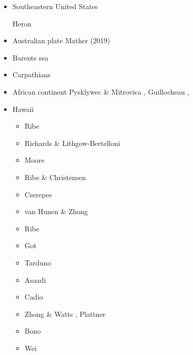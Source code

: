 \begin{itemize}
\item{Southeastern United States}

\begin{scriptsize}
Heron \etal \cite{heps18}
\end{scriptsize}


\item Australian plate 
{\scriptsize
\cite{himu03}\cite{wemv03}\cite{pymi03}\cite{onml03}
\cite{onmj05}
\cite{hazs10}\cite{dimg10}
\cite{mahg11}\cite{digm11}
\cite{gosk14}
\cite{scsp15}
Mather \etal (2019) \cite{mamr19}
}
\item Barents sea 
{\scriptsize
\cite{buto07b}
\cite{gahs13}
\cite{gahs14}
}
\item Carpathians 
{\scriptsize
\cite{clbm04}
\cite{isms05}
\cite{nehe06}
\cite{sepg19}
}
\item African continent 
{\scriptsize
\cite{gikb94}
Pysklywec \& Mitrovica \cite{pymi99},
\cite{vabt11}
\cite{busm12}
\cite{gagb14}
\cite{wakc17}
Guillocheau \etal \cite{gusb18},
\cite{cels20}
}
\item Hawaii 

\begin{scriptsize}
\begin{itemize}
\item[\nineteeneightyeight] Ribe \cite{ribe88}
\item[\nineteenninetysix] Richards \& Lithgow-Bertelloni \cite{rili96}
\item[\nineteenninetyeight] Moore \etal \cite{most98}
\item[\nineteenninetynine] Ribe \& Christensen \cite{rich99}
\item[\twothousand] Cserepes \etal \cite{cscr00} 
\item[\twothousandthree] van Hunen \& Zhong \cite{vazh03}
\item[\twothousandfour] Ribe \cite{ribe04}
\item[\twothousandeight] Got \etal \cite{gomm08}
\item[\twothousandnine] Tarduno \etal \cite{tabs09}
\item[\twothousandeleven] Asaadi \etal \cite{asrs11}
\item[\twothousandtwelve] Cadio \etal \cite{cabp12}
\item[\twothousandthirteen] Zhong \& Watts \cite{zhwa13}, Plattner \etal \cite{plab13}
\item[\twothousandnineteen] Bono \etal \cite{botb19}
\item[\twothousandtwenty] Wei \etal \cite{wesl20}
\end{itemize}
\end{scriptsize}


\end{itemize}

